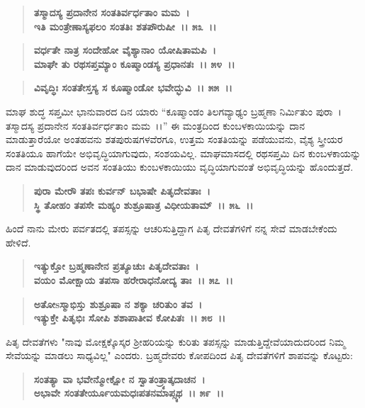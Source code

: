 \begin{verse}
\textbf{ತಸ್ಮಾದಸ್ಯ ಪ್ರದಾನೇನ ಸಂತತಿರ್ವರ್ಧತಾಂ ಮಮ~।}\\\textbf{ಇತಿ ಮಂತ್ರೇಣಾಸ್ಯಫಲಂ ಸಂತತಿಃ ಶತಪೌರುಷೀ~।। ೫೩~।। }
\end{verse}

\begin{verse}
\textbf{ವರ್ಧತೇ ನಾತ್ರ ಸಂದೇಹೋ ವೈಶ್ಯಾನಾಂ ಯೋಷಿತಾಮಪಿ~।}\\\textbf{ಮಾಘೇ ತು ರಥಸಪ್ತಮ್ಯಾಂ ಕೂಷ್ಮಾಂಡಸ್ಯ ಪ್ರಧಾನತಃ~।। ೫೪~।। }
\end{verse}

\begin{verse}
\textbf{ವಿವೃದ್ಧಿಃ ಸಂತತೇಸ್ತಸ್ಯ ಸ ಕೂಷ್ಮಾಂಡೋ ಭವೇದ್ಭುವಿ~।। ೫೫~।।}
\end{verse}

ಮಾಘ ಶುದ್ಧ ಸಪ್ತಮೀ ಭಾನುವಾರದ ದಿನ ಯಾರು “ಕೂಷ್ಮಾಂಡಂ ತಿಲಗವ್ಯಾಢ್ಯಂ ಬ್ರಹ್ಮಣಾ ನಿರ್ಮಿತುಂ ಪುರಾ~। ತಸ್ಮಾದಸ್ಯ ಪ್ರದಾನೇನ ಸಂತತಿರ್ವರ್ಧತಾಂ ಮಮ~।।” ಈ ಮಂತ್ರದಿಂದ ಕುಂಬಳಕಾಯಿಯನ್ನು ದಾನ ಮಾಡುತ್ತಾರೆಯೋ ಅಂತಹವನು ಶತಪುರುಷಗಳವೆರಗೂ, ಉತ್ತಮ ಸಂತತಿಯನ್ನು ಪಡೆಯುವನು, ವೈಶ್ಯ ಸ್ತ್ರೀಯರ ಸಂತತಿಯೂ ಹಾಗೆಯೇ ಅಭಿವೃದ್ಧಿಯಾಗುವುದು, ಸಂಶಯವಿಲ್ಲ. ಮಾಘಮಾಸದಲ್ಲಿ ರಥಸಪ್ತಮಿ ದಿನ ಕುಂಬಳ\-ಕಾಯನ್ನು ದಾನ ಮಾಡುವುದರಿಂದ ಅವನ ಸಂತತಿಯು ಕುಂಬಳಕಾಯಿಯು ವೃದ್ಧಿಯಾಗುವಂತೆ ಅಭಿವೃದ್ಧಿಯನ್ನು ಹೊಂದುತ್ತದೆ.

\begin{verse}
\textbf{ಪುರಾ ಮೇರೌ ತಪಃ ಕುರ್ವನ್ ಬಭಾಷೇ ಪಿತೃದೇವತಾಃ~।}\\\textbf{ಸ್ಥಿ ತೋಹಂ ತಪಸೇ ಮಹ್ಯಂ ಶುಶ್ರೂಷಾತ್ರ ವಿಧೀಯತಾಮ್~।। ೫೬~।।}
\end{verse}

ಹಿಂದೆ ನಾನು ಮೇರು ಪರ್ವತದಲ್ಲಿ ತಪಸ್ಸನ್ನು ಆಚರಿಸುತ್ತಿದ್ದಾಗ ಪಿತೃ ದೇವತೆಗಳಿಗೆ ನನ್ನ ಸೇವೆ ಮಾಡಬೇಕೆಂದು ಹೇಳಿದೆ.

\begin{verse}
\textbf{ಇತ್ಯುಕ್ತೋ ಬ್ರಹ್ಮಣಾನೇನ ಪ್ರತ್ಯೂಚುಃ ಪಿತೃದೇವತಾಃ~।}\\\textbf{ವಯಂ ಮೋಕ್ಷಾಯ ತಪಸಾ ಹರೇರಾಧನೋದ್ಯ ತಾಃ~।। ೫೭~।।}
\end{verse}

\begin{verse}
\textbf{ಅತೋsಸ್ಮಾಭಿಸ್ತು ಶುಶ್ರೂಷಾ ನ ಶಕ್ಯಾ ಚರಿತುಂ ತವ~।}\\\textbf{ಇತ್ಯುಕ್ತೇ ಪಿತೃಭಿಃ ಸೋಪಿ ಶಶಾಪಾತೀವ ಕೋಪಿತಃ~।। ೫೮~।।}
\end{verse}

ಪಿತೃ ದೇವತೆಗಳು "ನಾವು ಮೋಕ್ಷಕ್ಕೊಸ್ಕರ ಶ‍್ರೀಹರಿಯನ್ನು ಕುರಿತು ತಪಸ್ಸನ್ನು ಮಾಡುತ್ತಿದ್ದೇವೆಯಾದುದರಿಂದ ನಿಮ್ಮ ಸೇವೆಯನ್ನು ಮಾಡಲು ಸಾಧ್ಯವಿಲ್ಲ" ಎಂದರು. ಬ್ರಹ್ಮದೇವರು ಕೋಪದಿಂದ ಪಿತೃ ದೇವತೆಗಳಿಗೆ ಶಾಪವನ್ನು ಕೊಟ್ಟರು:

\begin{verse}
\textbf{ಸಂತತ್ಯಾ ವಾ ಭವೇನ್ಮೋಕ್ಷೋ ನ ಸ್ವಾತಂತ್ರ್ಯಾತ್ಕದಾಚನ~।}\\\textbf{ಅಭಾವೇ ಸಂತತೇರ್ಯೂಯಮಧಃಪತನಮಾಪ್ಸ್ಯಥ~।। ೫೯~।। }
\end{verse}

